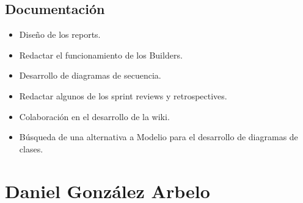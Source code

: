 \documentclass[../FINAL/Scrum/SCRUM.tex]{subfiles}
\begin{document}
\subsection*{Documentación}
\begin{itemize}
\item Diseño de los reports.
\item Redactar el funcionamiento de los Builders.
\item Desarrollo de diagramas de secuencia.
\item Redactar algunos de los sprint reviews y retrospectives.
\item Colaboración en el desarrollo de la wiki.
\item Búsqueda de una alternativa a Modelio para el desarrollo de diagramas de clases.
\end{itemize}

\section{Daniel González Arbelo}
\end{document}
